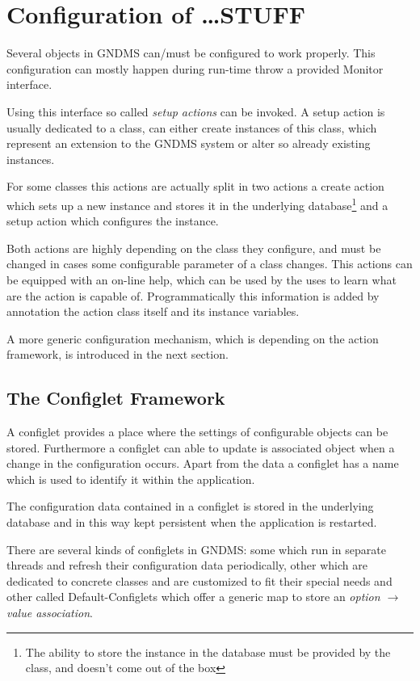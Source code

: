 
\section {Configuration of \ldots STUFF}
Several objects in GNDMS can/must be configured to work properly. This
configuration can mostly happen during run-time throw a provided
Monitor interface.

Using this interface so called \textit{setup actions} can be invoked.
A setup action is usually dedicated to a class, can either create
instances of this class, which represent an extension to the GNDMS
system or alter so already existing instances. 

For some classes this actions are actually split in two actions a
create action which sets up a new instance and stores it in the
underlying database\footnote{The ability to store the instance in the
database must be provided by the class, and doesn't come out of the
box} and a setup action which configures the instance.

Both actions are highly depending on the class they configure, and
must be changed in cases some configurable parameter of a class
changes. This actions can be equipped with an on-line help, which can
be used by the uses to learn what are the action is capable of.
Programmatically this information is added by annotation the action
class itself and its instance variables.

A more generic configuration mechanism, which is depending on the
action framework, is introduced in the next section.

\subsection{The Configlet Framework}

A configlet provides a place where the settings of configurable
objects can be stored. Furthermore a configlet can able to update is
associated object when a change in the configuration occurs.
Apart from the data a configlet has a name which is used to identify
it within the application.

The configuration data contained in a configlet is stored in the
underlying database and in this way kept persistent when the
application is restarted.

There are several kinds of configlets in GNDMS: some which run in
separate threads and refresh their configuration data periodically,
other which are dedicated to concrete classes and are customized to
fit their special needs and other called \glqq Default-Configlets\grqq
which offer a generic map to store an \textit{option $\rightarrow$
value association}.

